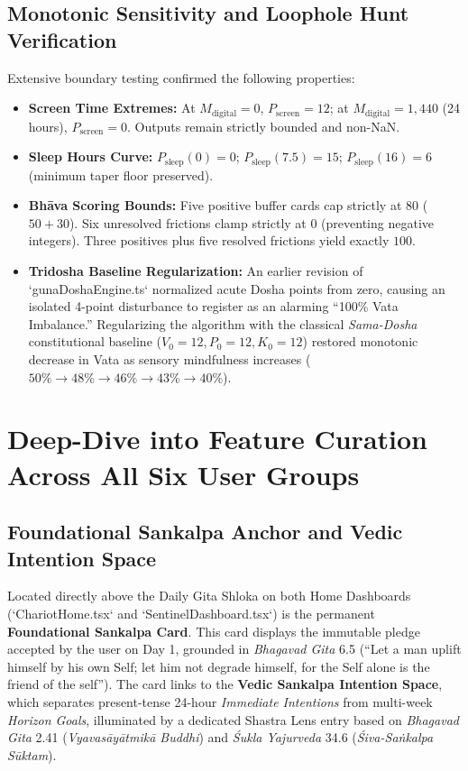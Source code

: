 \documentclass[11pt,a4paper]{article}
\begin{document}
\subsection{Monotonic Sensitivity and Loophole Hunt Verification}
Extensive boundary testing confirmed the following properties:
\begin{itemize}[leftmargin=*]
    \item \textbf{Screen Time Extremes:} At $M_{\text{digital}} = 0$, $P_{\text{screen}} = 12$; at $M_{\text{digital}} = 1{,}440$ (24 hours), $P_{\text{screen}} = 0$. Outputs remain strictly bounded and non-NaN.
    \item \textbf{Sleep Hours Curve:} $P_{\text{sleep}}(0) = 0$; $P_{\text{sleep}}(7.5) = 15$; $P_{\text{sleep}}(16) = 6$ (minimum taper floor preserved).
    \item \textbf{Bh\=ava Scoring Bounds:} Five positive buffer cards cap strictly at $80$ ($50 + 30$). Six unresolved frictions clamp strictly at $0$ (preventing negative integers). Three positives plus five resolved frictions yield exactly $100$.
    \item \textbf{Tridosha Baseline Regularization:} An earlier revision of `gunaDoshaEngine.ts` normalized acute Dosha points from zero, causing an isolated 4-point disturbance to register as an alarming ``100\% Vata Imbalance.'' Regularizing the algorithm with the classical \textit{Sama-Dosha} constitutional baseline ($V_0 = 12, P_0 = 12, K_0 = 12$) restored monotonic decrease in Vata as sensory mindfulness increases ($50\% \rightarrow 48\% \rightarrow 46\% \rightarrow 43\% \rightarrow 40\%$).
\end{itemize}

\section{Deep-Dive into Feature Curation Across All Six User Groups}

\subsection{Foundational Sankalpa Anchor and Vedic Intention Space}
Located directly above the Daily Gita Shloka on both Home Dashboards (`ChariotHome.tsx` and `SentinelDashboard.tsx`) is the permanent \textbf{Foundational Sankalpa Card}. This card displays the immutable pledge accepted by the user on Day 1, grounded in \textit{Bhagavad Gita} 6.5 (``Let a man uplift himself by his own Self; let him not degrade himself, for the Self alone is the friend of the self''). The card links to the \textbf{Vedic Sankalpa Intention Space}, which separates present-tense 24-hour \textit{Immediate Intentions} from multi-week \textit{Horizon Goals}, illuminated by a dedicated Shastra Lens entry based on \textit{Bhagavad Gita} 2.41 (\textit{Vyavas\=ay\=atmik\=a Buddhi}) and \textit{\'{S}ukla Yajurveda} 34.6 (\textit{\'{S}iva-Sa\.{n}kalpa S\=uktam}).
\end{document}
